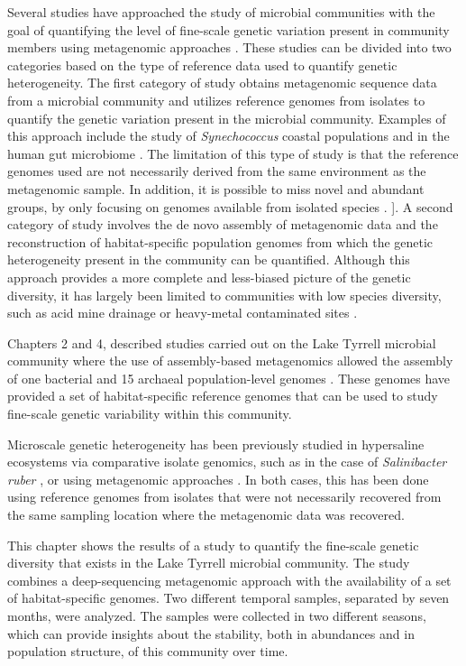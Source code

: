 Several studies have approached the study of microbial communities with the goal of quantifying the level of fine-scale genetic variation present in community members using metagenomic approaches  \cite{Wilmes:2009bn}. These studies can be divided into two categories based on the type of reference data used to quantify genetic heterogeneity. The first category of study obtains metagenomic sequence data from a microbial community and utilizes reference genomes from isolates to quantify the genetic variation present in the microbial community. Examples of this approach include the study of \textit{Synechococcus} coastal populations \cite{Tai:2011jo} and in the human gut microbiome \cite{Schloissnig:2012hx}. The limitation of this type of study is that the reference genomes used are not necessarily derived from the same environment as the metagenomic sample. In addition, it is possible to miss novel and abundant groups, by only focusing on genomes available from isolated species \cite{Podell:2013kx,Herlemann:uy}. ]. A second category of study involves the de novo assembly of metagenomic data and the reconstruction of habitat-specific population genomes from which the genetic heterogeneity present in the community can be quantified. Although this approach provides a more complete and less-biased picture of the genetic diversity, it has largely been limited to communities with low species diversity, such as acid mine drainage \cite{Allen:2007ju} or heavy-metal contaminated sites \cite{Hemme:2010ds}.

Chapters 2 and 4, described studies carried out on the Lake Tyrrell microbial community where the use of assembly-based metagenomics allowed the assembly of one bacterial and 15 archaeal population-level genomes \cite{Narasingarao:2012kp,Podell:2013kx,Podell:2013fp}. These genomes have provided a set of habitat-specific reference genomes that can be used to study fine-scale genetic variability within this community.

Microscale genetic heterogeneity has been previously studied in hypersaline ecosystems via comparative isolate  genomics, such as in the case of \textit{Salinibacter ruber} \cite{PeNtildeA:2010ie}, or using metagenomic approaches \cite{Legault:2006kh,Pasic:2009bo}. In both cases, this has been done using reference genomes from isolates that were not necessarily recovered from the same sampling location where the metagenomic data was recovered. 

This chapter shows the results of a study to quantify the fine-scale genetic diversity that exists in the Lake Tyrrell microbial community. The study combines a deep-sequencing metagenomic approach with the availability of a set of habitat-specific genomes. Two different temporal samples, separated by seven months, were analyzed. The samples were collected in two different seasons, which can provide insights about the stability, both in abundances and in population structure, of this community over time.


